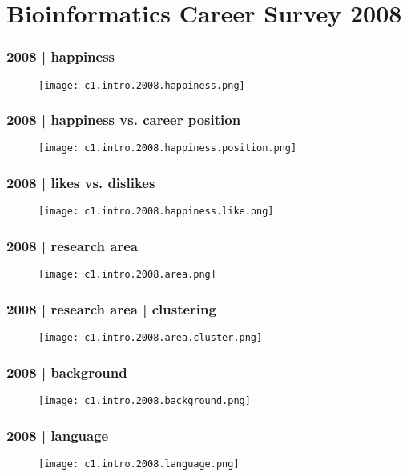 \section{Bioinformatics Career Survey 2008}
\begin{frame}
  \frametitle{2008 | happiness}
   \begin{figure}
     \centering
     \texttt{[image: c1.intro.2008.happiness.png]}
   \end{figure}
\end{frame}

\begin{frame}
  \frametitle{2008 | happiness vs. career position}
   \begin{figure}
     \centering
     \texttt{[image: c1.intro.2008.happiness.position.png]}
   \end{figure}
\end{frame}

\begin{frame}
  \frametitle{2008 | likes vs. dislikes}
   \begin{figure}
     \centering
     \texttt{[image: c1.intro.2008.happiness.like.png]}
   \end{figure}
\end{frame}

\begin{frame}
  \frametitle{2008 | research area}
   \begin{figure}
     \centering
     \texttt{[image: c1.intro.2008.area.png]}
   \end{figure}
\end{frame}

\begin{frame}
  \frametitle{2008 | research area | clustering}
   \begin{figure}
     \centering
     \texttt{[image: c1.intro.2008.area.cluster.png]}
   \end{figure}
\end{frame}

\begin{frame}
  \frametitle{2008 | background}
   \begin{figure}
     \centering
     \texttt{[image: c1.intro.2008.background.png]}
   \end{figure}
\end{frame}

\begin{frame}
  \frametitle{2008 | language}
   \begin{figure}
     \centering
     \texttt{[image: c1.intro.2008.language.png]}
   \end{figure}
\end{frame}

